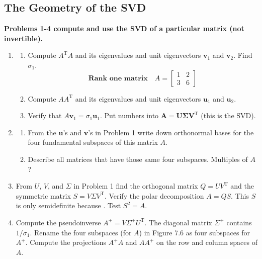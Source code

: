 \documentclass[14pt, a4paper]{article}
\begin{document}
\subsection{The Geometry of the SVD}
\noindent \textbf{Problems 1-4 compute and use the SVD of a particular matrix (not invertible).}
\begin{enumerate}
    \item
          \begin{enumerate}
              \item Compute $A^{\mathrm{T}}A$ and its eigenvalues and unit eigenvectors $\boldsymbol{v}_1$ and $\boldsymbol{v}_2$. Find $\sigma_1$.
                    \[
                        \textbf{Rank one matrix} \quad A = \begin{bmatrix} 1 & 2 \\ 3 & 6 \end{bmatrix}
                    \]
              \item Compute $AA^{\mathrm{T}}$ and its eigenvalues and unit eigenvectors $\boldsymbol{u}_1$ and $\boldsymbol{u}_2$.
              \item Verify that $A\boldsymbol{v}_1 = \sigma_1\boldsymbol{u}_1$. Put numbers into $\boldsymbol{A = U\Sigma V^{\mathrm{T}}}$ (this is the SVD).
          \end{enumerate}

    \item
          \begin{enumerate}
              \item From the $\boldsymbol{u}$'s and $\boldsymbol{v}$'s in Problem 1 write down orthonormal bases for the four fundamental subspaces of this matrix $A$.
              \item Describe all matrices that have those same four subspaces. Multiples of $A$?
          \end{enumerate}

    \item From $U$, $V$, and $\Sigma$ in Problem 1 find the orthogonal matrix $Q = UV^{\mathrm{T}}$ and the symmetric matrix $S = V\Sigma V^{\mathrm{T}}$. Verify the polar decomposition $A = QS$. This $S$ is only semidefinite because \underline{\hspace{1cm}}. Test $S^2 = A$.

    \item Compute the pseudoinverse $A^+ = V\Sigma^+U^{\mathrm{T}}$. The diagonal matrix $\Sigma^+$ contains $1/\sigma_1$. Rename the four subspaces (for $A$) in Figure 7.6 as four subspaces for $A^+$. Compute the projections $A^+A$ and $AA^+$ on the row and column spaces of $A$.
\end{enumerate}
\end{document}
